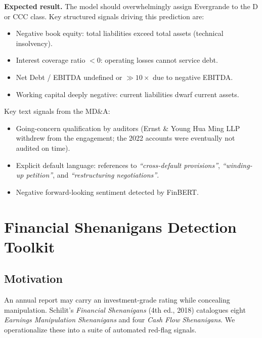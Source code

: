 \documentclass[12pt, a4paper]{article}
\begin{document}
\begin{keyinsight}
\textbf{Expected result.}  The model should overwhelmingly assign Evergrande to the D or CCC class.  Key structured signals driving this prediction are:
\begin{itemize}
  \item Negative book equity: total liabilities exceed total assets (technical insolvency).
  \item Interest coverage ratio $<0$: operating losses cannot service debt.
  \item Net Debt / EBITDA undefined or $\gg 10\times$ due to negative EBITDA.
  \item Working capital deeply negative: current liabilities dwarf current assets.
\end{itemize}

Key text signals from the MD\&A:
\begin{itemize}
  \item Going-concern qualification by auditors (Ernst \& Young Hua Ming LLP withdrew from the engagement; the 2022 accounts were eventually not audited on time).
  \item Explicit default language: references to \emph{``cross-default provisions''}, \emph{``winding-up petition''}, and \emph{``restructuring negotiations''}.
  \item Negative forward-looking sentiment detected by FinBERT.
\end{itemize}
\end{keyinsight}

\newpage

\section{Financial Shenanigans Detection Toolkit}
\label{sec:shenanigans}

\subsection{Motivation}

An annual report may carry an investment-grade rating while concealing manipulation.  Schilit's \textit{Financial Shenanigans} (4th ed., 2018) catalogues eight \emph{Earnings Manipulation Shenanigans} and four \emph{Cash Flow Shenanigans}.  We operationalize these into a suite of automated red-flag signals.
\end{document}

